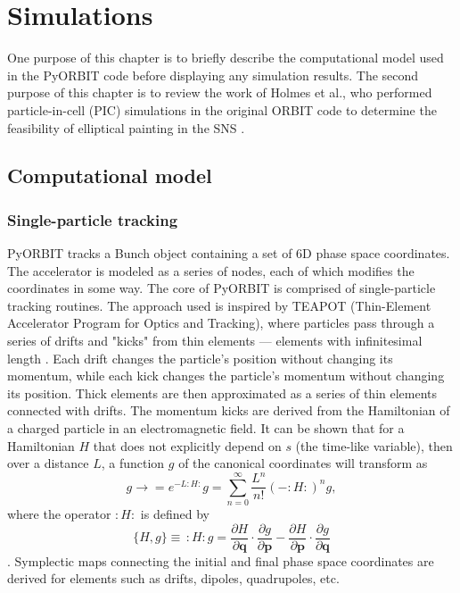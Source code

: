 \chapter{Simulations} \label{chap-3}

One purpose of this chapter is to briefly describe the computational model used in the PyORBIT code \cite{Shishlo2015} before displaying any simulation results. The second purpose of this chapter is to review the work of Holmes et al., who performed particle-in-cell (PIC) simulations in the original ORBIT code to determine the feasibility of elliptical painting in the SNS \cite{Holmes2018}. 



\section{Computational model}

\subsection{Single-particle tracking}

PyORBIT tracks a Bunch object containing a set of 6D phase space coordinates. The accelerator is modeled as a series of nodes, each of which modifies the coordinates in some way. The core of PyORBIT is comprised of single-particle tracking routines. The approach used is inspired by TEAPOT (Thin-Element Accelerator Program for Optics and Tracking), where particles pass through a series of drifts and "kicks" from thin elements — elements with infinitesimal length \cite{Schachinger1987}. Each drift changes the particle's position without changing its momentum, while each kick changes the particle's momentum without changing its position. Thick elements are then approximated as a series of thin elements connected with drifts. The momentum kicks are derived from the Hamiltonian of a charged particle in an electromagnetic field. It can be shown that for a Hamiltonian $H$ that does not explicitly depend on $s$ (the time-like variable), then over a distance $L$, a function $g$ of the canonical coordinates will transform as
%
\begin{equation}
    g \rightarrow 
    = e^{-L:H:} g
    = \sum_{n=0}^{\infty}{\frac{L^n}{n!} (-:H:)^n g},
\end{equation}
%
where the operator $:H:$ is defined by
%
\begin{equation}
    \{H, g\} \equiv \, :H: g =
    \frac{\partial{H}}{\partial{\mathbf{q}}}
    \cdot
    \frac{\partial{g}}{\partial{\mathbf{p}}}
    -
    \frac{\partial{H}}{\partial{\mathbf{p}}}
    \cdot
    \frac{\partial{g}}{\partial{\mathbf{q}}}
\end{equation}
%
\cite{Dragt2018, Forest1998}. Symplectic maps connecting the initial and final phase space coordinates are derived for elements such as drifts, dipoles, quadrupoles, etc.

